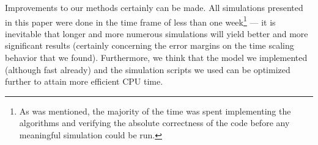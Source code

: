 Improvements to our methods certainly can be made. All simulations presented in this paper were done in the time frame of less than one week\footnote{As was mentioned, the majority of the time was spent implementing the algorithms and verifying the absolute correctness of the code before any meaningful simulation could be run.}
--- it is inevitable that longer and more numerous simulations will yield better and more significant results (certainly concerning the error margins on the time scaling behavior that we found). Furthermore, we think that the model we implemented (although fast already) and the simulation scripts we used can be optimized further to attain more efficient CPU time.
